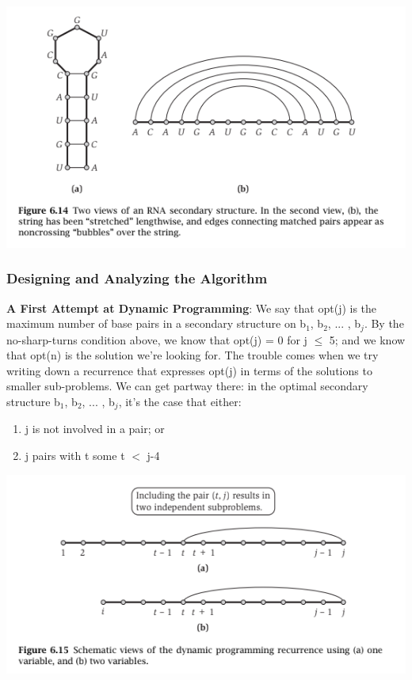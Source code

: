 \documentclass{article}
\begin{document}
\begin{center}
    \includegraphics[]{figures/fig18.png}
\end{center}

\subsubsection{Designing and Analyzing the Algorithm}
\textbf{A First Attempt at Dynamic Programming}: We say that opt(j) is the maximum number of base pairs in a secondary structure on b$_1$, b$_2$, ... , b$_j$. By the no-sharp-turns condition above, we know that opt(j) = 0 for j $\le$ 5; and we know that opt(n) is the solution we're looking for. The trouble comes when we try writing down a recurrence that expresses opt(j) in terms of the solutions to smaller sub-problems. We can get partway there: in the optimal secondary structure b$_1$, b$_2$, ... , b$_j$, it's the case that either:\\

\begin{enumerate}
    \item j is not involved in a pair; or
    \item j pairs with t some t $<$ j-4
\end{enumerate}

\begin{center}
    \includegraphics[]{figures/fig19.png}
\end{center}
\end{document}
